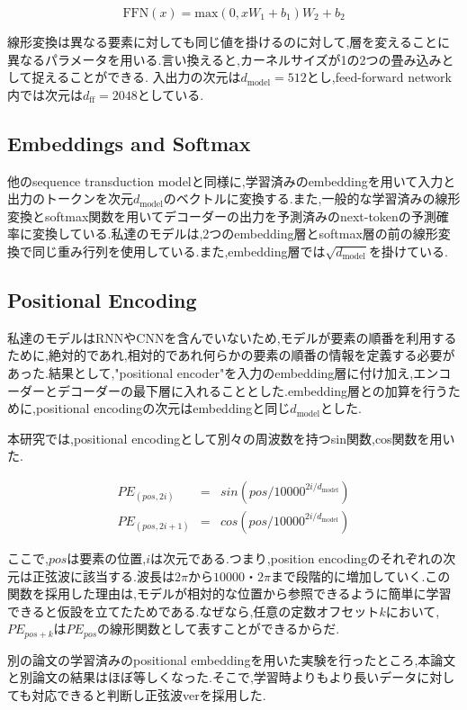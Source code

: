 \documentclass{jarticle}     %
\begin{document}
\begin{equation}
  \mathrm{FFN}(x) = \mathrm{max}(0,xW_\mathrm{1}+b_\mathrm{1})W_\mathrm{2} + b_\mathrm{2}
\end{equation}

線形変換は異なる要素に対しても同じ値を掛けるのに対して,層を変えることに異なるパラメータを用いる.言い換えると,カーネルサイズが1の2つの畳み込みとして捉えることができる.
入出力の次元は$d_\mathrm{model} = 512$とし,feed-forward network内では次元は$d_\mathrm{ff} = 2048$としている.

\subsection{Embeddings and Softmax}
他のsequence transduction modelと同様に,学習済みのembeddingを用いて入力と出力のトークンを次元$d_\mathrm{model}$のベクトルに変換する.また,一般的な学習済みの線形変換とsoftmax関数を用いてデコーダーの出力を予測済みのnext-tokenの予測確率に変換している.私達のモデルは,2つのembedding層とsoftmax層の前の線形変換で同じ重み行列を使用している.また,embedding層では$\sqrt{d_\mathrm{model}}$を掛けている.

\subsection{Positional Encoding}
私達のモデルはRNNやCNNを含んでいないため,モデルが要素の順番を利用するために,絶対的であれ,相対的であれ何らかの要素の順番の情報を定義する必要があった.結果として,"positional encoder"を入力のembedding層に付け加え,エンコーダーとデコーダーの最下層に入れることとした.embedding層との加算を行うために,positional encodingの次元はembeddingと同じ$d_\mathrm{model}$とした.\par
本研究では,positional encodingとして別々の周波数を持つsin関数,cos関数を用いた.

\begin{eqnarray*}
  PE_{(pos,2i)} &= &sin(pos/10000^{2i/d_\mathrm{model}}) \\
  PE_{(pos,2i+1)} &= &cos(pos/10000^{2i/d_\mathrm{model}})
\end{eqnarray*}

ここで,$pos$は要素の位置,$i$は次元である.つまり,position encodingのそれぞれの次元は正弦波に該当する.波長は$2\pi$から$10000・2\pi$まで段階的に増加していく.この関数を採用した理由は,モデルが相対的な位置から参照できるように簡単に学習できると仮設を立てたためである.なぜなら,任意の定数オフセット$k$において,$PE_{pos+k}$は$PE_{pos}$の線形関数として表すことができるからだ.\par
別の論文の学習済みのpositional embeddingを用いた実験を行ったところ,本論文と別論文の結果はほぼ等しくなった.そこで,学習時よりもより長いデータに対しても対応できると判断し正弦波verを採用した.
\end{document}
